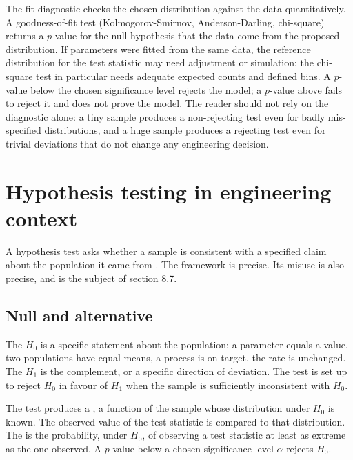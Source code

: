 

The fit diagnostic checks the chosen distribution against the data
quantitatively. A goodness-of-fit test (Kolmogorov-Smirnov,
Anderson-Darling, chi-square) returns a $p$-value for the null
hypothesis that the data come from the proposed distribution. If
parameters were fitted from the same data, the reference
distribution for the test statistic may need adjustment or
simulation; the chi-square test in particular needs adequate
expected counts and defined bins. A $p$-value below the chosen
significance level rejects the model; a $p$-value above fails to
reject it and does not prove the model. The reader should not rely
on the diagnostic alone: a tiny sample produces a non-rejecting test
even for badly mis-specified distributions, and a huge sample
produces a rejecting test even for trivial deviations that do not
change any engineering decision.

\section{Hypothesis testing in engineering context}

A hypothesis test asks whether a sample is consistent with a
specified claim about the population it came from
\cite[ch.~10]{text:wasserman2004}. The framework is precise. Its
misuse is also precise, and is the subject of section 8.7.

\subsection{Null and alternative}

The  $H_{0}$ is a specific statement about
the population: a parameter equals a value, two populations have
equal means, a process is on target, the rate is unchanged. The
 $H_{1}$ is the complement, or a
specific direction of deviation. The test is set up to reject $H_{0}$
in favour of $H_{1}$ when the sample is sufficiently inconsistent
with $H_{0}$.

The test produces a , a function of the
sample whose distribution under $H_{0}$ is known. The observed value
of the test statistic is compared to that distribution. The
 is the probability, under $H_{0}$, of observing a
test statistic at least as extreme as the one observed. A $p$-value
below a chosen significance level $\alpha$ rejects $H_{0}$.

